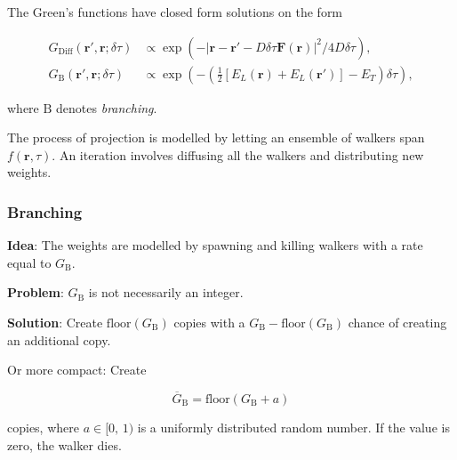 \begin{frame}
 The Green's functions have closed form solutions on the form
 
 \begin{align*}
  G_{\mathrm{Diff}}(\mathbf{r}', \mathbf{r}; \delta\tau) &\propto \exp\left(-\left|\mathbf{r}-\mathbf{r}' - D\delta\tau \mathbf{F}(\mathbf{r})\right|^2/4D\delta\tau\right), \\
  G_{\mathrm{B}}(\mathbf{r}', \mathbf{r}; \delta\tau) &\propto \exp\left(-\left(\frac{1}{2}\left[E_L(\mathbf{r}) + E_L(\mathbf{r}')\right] - E_T\right)\delta\tau\right),
 \end{align*}

 where $\mathrm{B}$ denotes \textit{branching}.
 
\end{frame}

\begin{frame}
 The process of projection is modelled by letting an ensemble of walkers span $f(\mathbf{r}, \tau)$. An iteration involves diffusing all the walkers and distributing new weights. 
\end{frame}

\begin{frame}
\frametitle{Branching}

\textbf{Idea}: The weights are modelled by spawning and killing walkers with a rate equal to $G_\mathrm{B}$. 

\pause
\vspace{0.5cm}
\textbf{Problem}: $G_\mathrm{B}$ is not necessarily an integer.

\pause
\vspace{0.5cm}
\textbf{Solution}: Create $\mathrm{floor}(G_\mathrm{B})$ copies with a $G_\mathrm{B} - \mathrm{floor}(G_\mathrm{B})$ chance of creating an additional copy.

\vspace{0.5cm}
\pause
Or more compact: Create 

\begin{equation}
\overline{G}_\mathrm{B} = \mathrm{floor}(G_\mathrm{B} + a)
\end{equation}

copies, where $a \in [0,\,1)$ is a uniformly distributed random number. If the value is zero, the walker dies.

\end{frame}


